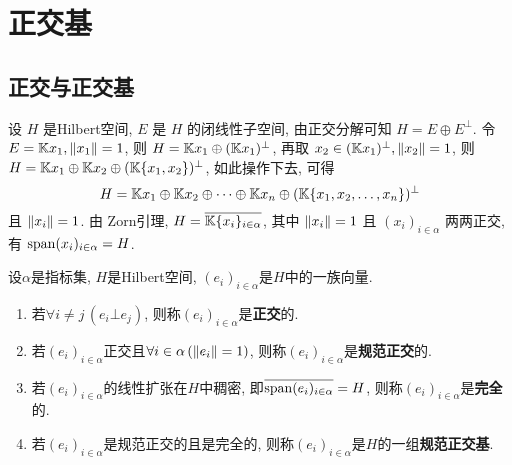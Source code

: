 \section{正交基}
\subsection{正交与正交基}
设 $ H $ 是Hilbert空间, $ E $ 是 $ H $ 的闭线性子空间, 由正交分解可知 $ H=E\oplus E^{\bot} $. 令 $ E=\mathbb{K} x_{1}, \left\| x_{1} \right\|=1 $, 则 $ H=\mathbb{K} x_{1}\oplus (\mathbb{K} x_{1})^{\bot} $, 再取 $ x_{2}\in (\mathbb{K} x_{1})^{\bot}, \left\| x_{2} \right\|=1 $, 则 $ H=\mathbb{K} x_{1}\oplus \mathbb{K} x_{2}\oplus (\mathbb{K}\{ x_{1}, x_{2} \})^{\bot} $, 如此操作下去, 可得
\[
	H=\mathbb{K} x_{1}\oplus \mathbb{K} x_{2}\oplus\cdots\oplus\mathbb{K} x_{n}\oplus(\mathbb{K} \{ x_{1}, x_{2}, \dots, x_{n} \})^{\bot}
\]
且 $ \left\| x_{i} \right\|=1 $. 由 Zorn引理, $ H=\overline{\mathbb{K}\{ x_{i} \}_{i\in\alpha}} $, 其中 $ \left\| x_{i} \right\|=1 $ 且 $ (x_{i})_{i\in\alpha} $ 两两正交, 有 $ \operatorname{span}(x_{i})_{i\in\alpha}=H $.

\begin{Definition}[规范正交基]
	设$ \alpha $是指标集, $ H $是Hilbert空间, $ (e_i)_{i\in\alpha} $是$ H $中的一族向量.
	\begin{enumerate}[(1)]
		\item 若$ \forall i\ne j\,(e_i\bot e_j) $, 则称$ (e_i)_{i\in\alpha} $是\textbf{正交}的.
		\item 若$ (e_i)_{i\in\alpha} $正交且$ \forall i\in\alpha\,(\left\| e_i \right\|=1) $, 则称$ (e_i)_{i\in\alpha} $是\textbf{规范正交}的.
		\item 若$ (e_i)_{i\in\alpha} $的线性扩张在$ H $中稠密, 即$ \overline{\operatorname{span} (e_i)_{i\in\alpha}}=H $, 则称$ (e_i)_{i\in\alpha} $是\textbf{完全}的.
		\item 若$ (e_i)_{i\in\alpha} $是规范正交的且是完全的, 则称$ (e_i)_{i\in\alpha} $是$ H $的一组\textbf{规范正交基}.
	\end{enumerate}
\end{Definition}

